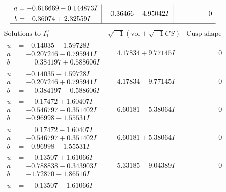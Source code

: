 \documentclass[1p]{elsarticle_modified}
\theoremstyle{definition}
\newcommand{\I}{\sqrt{-1}}
\begin{document}
$$\begin{array}{c|c|c}
\begin{aligned}
a &= -0.616669 - 0.144873 I \\
b &= \phantom{-}0.36074 + 2.32559 I\end{aligned}
 & \phantom{-}0.36466 - 4.95042 I & \phantom{-0.000000 } 0\\
 \hline 
 \end{array}$$\newpage$$\begin{array}{c|c|c}  
\text{Solutions to }I^u_{1}& \I (\text{vol} + \sqrt{-1}CS) & \text{Cusp shape}\\
 \hline 
\begin{aligned}
u &= -0.14035 + 1.59728 I \\
a &= -0.207246 - 0.795941 I \\
b &= \phantom{-}0.384197 + 0.588606 I\end{aligned}
 & \phantom{-}4.17834 + 9.77145 I & \phantom{-0.000000 } 0 \\ \hline\begin{aligned}
u &= -0.14035 - 1.59728 I \\
a &= -0.207246 + 0.795941 I \\
b &= \phantom{-}0.384197 - 0.588606 I\end{aligned}
 & \phantom{-}4.17834 - 9.77145 I & \phantom{-0.000000 } 0 \\ \hline\begin{aligned}
u &= \phantom{-}0.17472 + 1.60407 I \\
a &= -0.546797 - 0.351402 I \\
b &= -0.96998 + 1.55531 I\end{aligned}
 & \phantom{-}6.60181 - 5.38064 I & \phantom{-0.000000 } 0 \\ \hline\begin{aligned}
u &= \phantom{-}0.17472 - 1.60407 I \\
a &= -0.546797 + 0.351402 I \\
b &= -0.96998 - 1.55531 I\end{aligned}
 & \phantom{-}6.60181 + 5.38064 I & \phantom{-0.000000 } 0 \\ \hline\begin{aligned}
u &= \phantom{-}0.13507 + 1.61066 I \\
a &= -0.788838 - 0.343903 I \\
b &= -1.72870 + 1.86516 I\end{aligned}
 & \phantom{-}5.33185 - 9.04389 I & \phantom{-0.000000 } 0 \\ \hline\begin{aligned}
u &= \phantom{-}0.13507 - 1.61066 I \\

\end{aligned}
\end{array}$$
\end{document}
